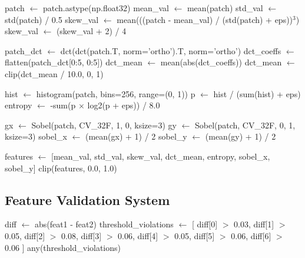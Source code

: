 \documentclass[12pt]{article}
\begin{document}
\begin{algorithm}[H]
\caption{Comprehensive Feature Computation}
\begin{algorithmic}[1]
\State patch $\gets$ patch.astype(np.float32)
\State {}
\State mean\_val $\gets$ mean(patch)
\State std\_val $\gets$ std(patch) / 0.5 
\State skew\_val $\gets$ mean(((patch - mean\_val) / (std(patch) + eps))$^3$)
\State skew\_val $\gets$ (skew\_val + 2) / 4 

\State {}
\State patch\_dct $\gets$ dct(dct(patch.T, norm='ortho').T, norm='ortho')
\State dct\_coeffs $\gets$ flatten(patch\_dct[0:5, 0:5])
\State dct\_mean $\gets$ mean(abs(dct\_coeffs))
\State dct\_mean $\gets$ clip(dct\_mean / 10.0, 0, 1)

\State {}
\State hist $\gets$ histogram(patch, bins=256, range=(0, 1))
\State p $\gets$ hist / (sum(hist) + eps)
\State entropy $\gets$ -sum(p $\times$ log2(p + eps)) / 8.0

\State {}
\State gx $\gets$ Sobel(patch, CV\_32F, 1, 0, ksize=3)
\State gy $\gets$ Sobel(patch, CV\_32F, 0, 1, ksize=3)
\State sobel\_x $\gets$ (mean(gx) + 1) / 2 
\State sobel\_y $\gets$ (mean(gy) + 1) / 2

\State features $\gets$ [mean\_val, std\_val, skew\_val, dct\_mean, entropy, sobel\_x, sobel\_y]
\State \Return clip(features, 0.0, 1.0)
\EndFunction
\end{algorithmic}
\end{algorithm}

\subsection{Feature Validation System}

\begin{algorithm}[H]
\caption{Patch-Strip Correspondence Validation}
\begin{algorithmic}[1]
\State diff $\gets$ abs(feat1 - feat2)
\State threshold\_violations $\gets$ [
    \State diff[0] $>$ 0.03, 
    \State diff[1] $>$ 0.05, 
    \State diff[2] $>$ 0.08, 
    \State diff[3] $>$ 0.06, 
    \State diff[4] $>$ 0.05, 
    \State diff[5] $>$ 0.06, 
    \State diff[6] $>$ 0.06  
\State ]
\State \Return any(threshold\_violations)
\EndFunction
\end{algorithmic}
\end{algorithm}
\end{document}
